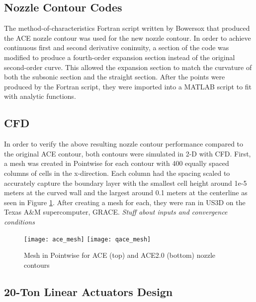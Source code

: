 \subsection{Nozzle Contour Codes}

The method-of-characteristics Fortran script written by Bowersox that produced the ACE nozzle contour was used for the new nozzle contour. In order to achieve continuous first and second derivative coninuity, a section of the code was modified to produce a fourth-order expansion section instead of the original second-order curve. This allowed the expansion section to match the curvature of both the subsonic section and the straight section.
After the points were produced by the Fortran script, they were imported into a MATLAB script to fit with analytic functions.

\subsection{CFD}

In order to verify the above resulting nozzle contour performance compared to the original ACE contour, both contours were simulated in 2-D with CFD. First, a mesh was created in Pointwise for each contour with 400 equally spaced columns of cells in the x-direction. Each column had the spacing scaled to accurately capture the boundary layer with the smallest cell height around 1e-5 meters at the curved wall and the largest around 0.1 meters at the centerline as seen in Figure \ref{fig:mesh}.
After creating a mesh for each, they were ran in US3D on the Texas A\&M supercomputer, GRACE. \textit{Stuff about inputs and convergence conditions}

\begin{figure}[ht]
    \centering
    \texttt{[image: ace\_mesh]}
    \texttt{[image: qace\_mesh]}
    \caption{Mesh in Pointwise for ACE (top) and ACE2.0 (bottom) nozzle contours}
    \label{fig:mesh}
\end{figure}

\subsection{20-Ton Linear Actuators Design}

